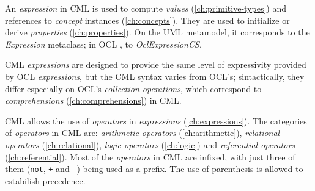 An \emph{expression} in CML is used to compute
\emph{values} (\ref{ch:primitive-types})
and references to \emph{concept} instances (\ref{ch:concepts}).
They are used to initialize or derive \emph{properties} (\ref{ch:properties}).
On the UML \cite{uml} metamodel,
it corresponds to the \emph{Expression} metaclass;
in OCL \cite{ocl}, to \emph{OclExpressionCS}.

CML \emph{expressions} are designed to provide the same level of
expressivity provided by OCL \emph{expressions},
but the CML syntax varies from OCL's;
sintactically, they differ especially on OCL's \emph{collection operations},
which correspond to \emph{comprehensions} (\ref{ch:comprehensions}) in CML.

CML allows the use of \emph{operators} in \emph{expressions} (\ref{ch:expressions}).
The categories of \emph{operators} in CML are:
\emph{arithmetic operators} (\ref{ch:arithmetic}),
\emph{relational operators} (\ref{ch:relational}),
\emph{logic operators} (\ref{ch:logic})
and \emph{referential operators} (\ref{ch:referential}).
Most of the \emph{operators} in CML are infixed,
with just three of them (\verb|not|, \verb|+| and \verb|-|) being used as a prefix.
The use of parenthesis is allowed to estabilish precedence.

